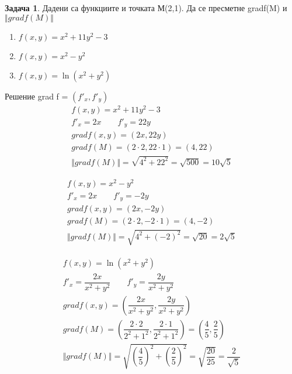 \documentclass[a4paper,fleqn,12pt]{article}
\theoremstyle{definition}
\newtheorem{task}{Задача}[subsection]
\begin{document}
\begin{task}
Дадени са функциите и точката М(2,1). Да се пресметне gradf(M) и $\Vert grad f(M)\Vert$
\begin{enumerate}
\item $ f(x,y) = x^2 + 11y^2 - 3$
\item $ f(x,y) = x^2 - y^2$
\item $ f(x,y) = \ln{(x^2 + y^2)}$
\end{enumerate}
Решение grad f = $(f'_x, f'_y)$
\begin{gather*}
 f(x,y) = x^2 + 11y^2 - 3\\
f'_x = 2x \qquad f'_y = 22y\\ 
gradf(x,y) = (2x, 22y)\\ 
gradf(M) = (2\cdot 2, 22 \cdot 1) = (4,22)\\
\Vert grad f(M)\Vert = \sqrt{4^2 + 22^2} = \sqrt{500} =  10\sqrt{5}
\end{gather*}

\begin{gather*}
f(x,y) = x^2 - y^2\\
f'_x = 2x \qquad f'_y = -2y\\ 
gradf(x,y) = (2x, -2y)\\ 
gradf(M) = (2\cdot 2, -2 \cdot 1) = (4,-2)\\
\Vert grad f(M)\Vert = \sqrt{4^2 + (-2)^2} = \sqrt{20} =  2\sqrt{5}
\end{gather*}

\begin{gather*}
f(x,y) = \ln{(x^2 + y^2)}\\
f'_x = \dfrac{2x}{x^2+y^2} \qquad f'_y = \dfrac{2y}{x^2+y^2}\\ 
gradf(x,y) = \left(\dfrac{2x}{x^2+y^2} , \dfrac{2y}{x^2+y^2} \right)\\ 
gradf(M) = \left(\dfrac{2 \cdot 2}{2^2+1^2}, \dfrac{2 \cdot 1}{2^2+1^2} \right) = \left(\dfrac{4}{5} , \dfrac{2}{5} \right) \\
\Vert grad f(M)\Vert = \sqrt{\left( \dfrac{4}{5} \right) ^2 + \left( \dfrac{2}{5} \right) ^2} = \sqrt{\dfrac{20}{25}} = \dfrac{2}{\sqrt{5}}
\end{gather*}

\end{task}
\end{document}
